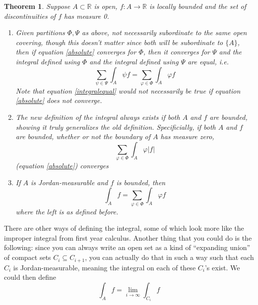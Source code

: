 \documentclass{article}
\newtheorem{theorem}{Theorem}
\newcommand{\reals}[0]{\mathbb{R}}
\begin{document}
\begin{theorem}
  Suppose \(A \subset \reals\) is open, \(f: A \to \reals\) is locally bounded and the set of discontinuities of \(f\) has measure 0.
  \begin{enumerate}

    \item Given partitions \(\Phi, \Psi\) as above, not necessarily subordinate to the same open covering, though this doesn't matter since both will be subordinate to \(\{A\}\), then if equation \ref{absolute} converges for \(\Phi\), then it converges for \(\Psi\) and the integral defined using \(\Phi\) and the integral defined using \(\Psi\) are equal, i.e.
    \begin{equation}
      \sum_{\psi \in \Psi}\int_A\psi f = \sum_{\varphi \in \Phi}\int_A\varphi f
      \label{integralequal}
    \end{equation}
    Note that equation \ref{integralequal} would not necessarily be true if equation \ref{absolute} does not converge.

    \item The new definition of the integral \textit{always} exists if both \(A\) and \(f\) are bounded, showing it truly generalizes the old definition. Specificially, if both \(A\) and \(f\) are bounded, whether or not the boundary of \(A\) has measure zero,
    \begin{equation}
      \sum_{\varphi \in \Phi}\int_A\varphi|f|
    \end{equation}
    (equation \ref{absolute}) converges

    \item If \(A\) is Jordan-measurable and \(f\) is bounded, then
    \begin{equation}
      \int_Af = \sum_{\varphi \in \Phi}\int_A\varphi f
    \end{equation}
    where the left is as defined before.

  \end{enumerate}
\end{theorem}
There are other ways of defining the integral, some of which look more like the improper integral from first year calculus. Another thing that you could do is the following: since you can always write an open set as a kind of ``expanding union'' of compact sets \(C_i \subseteq C_{i + 1}\), you can actually do that in such a way such that each \(C_i\) is Jordan-measurable, meaning the integral on each of these \(C_i\)'s exist. We could then define
\begin{equation}
  \int_Af = \lim_{i \to \infty}\int_{C_i}f
\end{equation}
\end{document}
